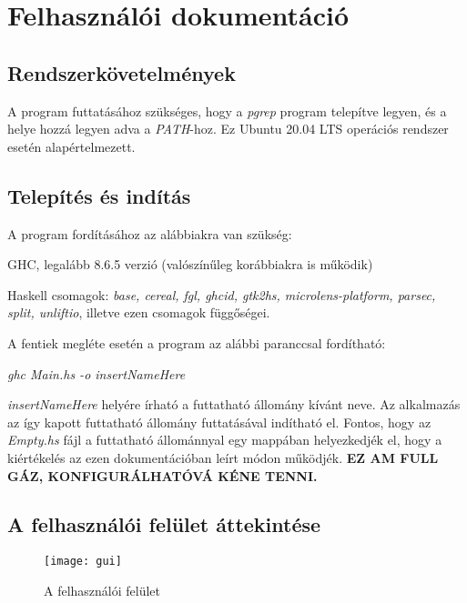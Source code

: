 \chapter{Felhasználói dokumentáció} %
\label{ch:user}

\section{Rendszerkövetelmények}

A program futtatásához szükséges, hogy a \textit{pgrep} program telepítve legyen, és a helye hozzá legyen adva a \textit{PATH}-hoz. Ez Ubuntu 20.04 LTS operációs rendszer esetén alapértelmezett.

\section{Telepítés és indítás}

A program fordításához az alábbiakra van szükség:
\begin{compactenum}
	\item GHC, legalább 8.6.5 verzió (valószínűleg korábbiakra is működik)
	\item Haskell csomagok: \textit{base, cereal, fgl, ghcid, gtk2hs, microlens-platform, parsec, split, unliftio}, illetve ezen csomagok függőségei. 
\end{compactenum}

A fentiek megléte esetén a program az alábbi paranccsal fordítható: 

\textit{ghc Main.hs -o insertNameHere}

\textit{insertNameHere} helyére írható a futtatható állomány kívánt neve. Az alkalmazás az így kapott futtatható állomány futtatásával indítható el. Fontos, hogy az \textit{Empty.hs} fájl a futtatható állománnyal egy mappában helyezkedjék el, hogy a kiértékelés az ezen dokumentációban leírt módon működjék. \textbf{EZ AM FULL GÁZ, KONFIGURÁLHATÓVÁ KÉNE TENNI.}

\section{A felhasználói felület áttekintése}

\begin{figure}[H]
	\centering
	\texttt{[image: gui]}
	\caption{A felhasználói felület}
	\label{fig:gui}
\end{figure}

